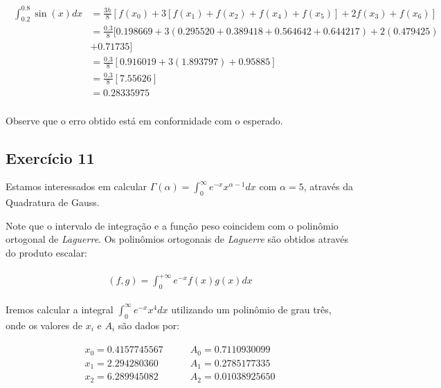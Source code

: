 \documentclass[paper=a4, fontsize=12pt]{scrartcl}
\numberwithin{equation}{section} %
\numberwithin{figure}{section} %
\numberwithin{table}{section} %
\newcommand{\euler}{e}
\begin{document}
		\begin{align*}
			\begin{split}
				\int_{0.2}^{0.8} \sin(x)  dx &= \frac{3h}{8}[ f(x_0) + 3[f(x_1) + f(x_2) + f(x_4) + f(x_5)] + 2f(x_3) + f(x_6)] \\
				&= \frac{0.3}{8}[0.198669 + 3(0.295520 + 0.389418 + 0.564642 + 0.644217) + 2(0.479425) \\ &+ 0.71735] \\
				&= \frac{0.3}{8}\left[0.916019 + 3(1.893797) + 0.95885\right]\\
				&= \frac{0.3}{8}\left[7.55626\right] \\
				&= 0.28335975\\
			\end{split}
		\end{align*}

		Observe que o erro obtido está em conformidade com o esperado.

		\subsection{Exercício 11}

		Estamos interessados em calcular $\Gamma(\alpha) = \int_{0}^{\infty} \euler^{-x}x^{\alpha-1} dx$ com $\alpha = 5$, através da Quadratura de Gauss.

		Note que o intervalo de integração e a função peso coincidem com o polinômio ortogonal de \textit{Laguerre}. Os polinômios ortogonais de  \textit{Laguerre} são obtidos através do produto escalar:

		\begin{align*}
		\begin{split}
			(f, g) = \int_{0}^{+\infty} \euler^{-x} f(x)g(x) dx
		\end{split}
		\end{align*}

		Iremos calcular a integral $ \int_{0}^{\infty} \euler^{-x}x^{4} dx $ utilizando um polinômio de grau três, onde os valores de $x_i$ e $A_i$ são dados por:

		\begin{align*}
		\begin{split}
			x_0 = 0.4157745567 	&\quad\quad A_0 = 0.7110930099 	\\
			x_1 = 2.294280360		&\quad\quad A_1 = 0.2785177335	\\
			x_2	=	6.289945082		&\quad\quad	A_2	=	0.01038925650
		\end{split}
		\end{align*}
\end{document}
